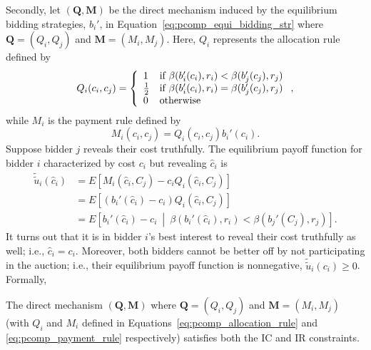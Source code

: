 Secondly, let $(\mathbf{Q},\mathbf{M})$ be the direct mechanism induced by the equilibrium bidding strategies, $b_i'$, in Equation~\eqref{eq:pcomp_equi_bidding_str} where $\mathbf{Q}=(Q_i,Q_j)$ and $\mathbf{M}=(M_i,M_j)$. Here, $Q_i$ represents the allocation rule defined by
\begin{equation}
	\label{eq:pcomp_allocation_rule}
	Q_i(c_i,c_j) =
	\left\{
	\begin{array}{l l}
		1 &\text{if } \beta(b_i'(c_i),r_i) < \beta(b_j'(c_j),r_j)\\
		\frac{1}{2} &\text{if } \beta(b_i'(c_i),r_i) = \beta(b_j'(c_j),r_j)\\
		0 &\text{otherwise}
	\end{array}
	\right.,
\end{equation}
while $M_i$ is the payment rule defined by
\begin{equation}
	\label{eq:pcomp_payment_rule}
	M_i(c_i,c_j) = Q_i(c_i,c_j)b_i'(c_i).
\end{equation}
Suppose bidder $j$ reveals their cost truthfully. The equilibrium payoff function for bidder $i$ characterized by cost $c_i$ but revealing $\hat{c}_i$ is
\begin{align}
	\tilde{\tilde{u}}_i(\hat{c}_i) &= E\left[ M_i(\hat{c}_i,C_j) - c_iQ_i(\hat{c}_i,C_j) \right]\nonumber \\
	&= E\left[ (b_i'(\hat{c}_i)-c_i)Q_i(\hat{c}_i,C_j) \right]\nonumber \\
	&= E\left[ b_i'(\hat{c}_i)-c_i \:\middle\vert\: \beta(b_i'(\hat{c}_i),r_i) < \beta(b_j'(C_j),r_j) \right].
	\label{eq:pcomp_expected_utility}
\end{align}
It turns out that it is in bidder $i$'s best interest to reveal their cost truthfully as well; i.e., $\hat{c}_i=c_i$. Moreover, both bidders cannot be better off by not participating in the auction; i.e., their equilibrium payoff function is nonnegative, $\tilde{\tilde{u}}_i(c_i)\ge 0$. Formally,
\begin{proposition}
\label{prop:pcomp_direct_mechanism}
The direct mechanism $(\mathbf{Q},\mathbf{M})$ where $\mathbf{Q}=(Q_i,Q_j)$ and $\mathbf{M}=(M_i,M_j)$ (with $Q_i$ and $M_i$ defined in Equations~\eqref{eq:pcomp_allocation_rule} and \eqref{eq:pcomp_payment_rule} respectively) satisfies both the IC and IR constraints.
\end{proposition}

